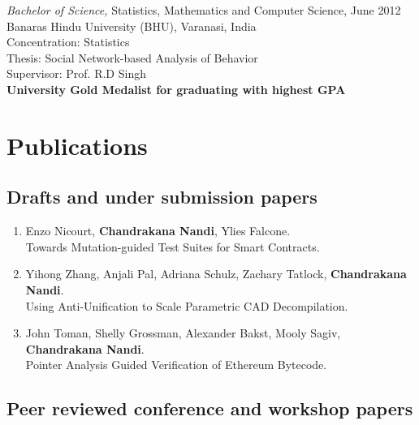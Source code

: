 \documentclass[margin, 10pt]{res} %
\begin{document}
\begin{resume}
{\sl Bachelor of Science,} Statistics, Mathematics and Computer Science, June 2012 \\
Banaras Hindu University (BHU), Varanasi, India \\
Concentration: Statistics \\
Thesis: Social Network-based Analysis of Behavior \\ Supervisor: Prof. R.D Singh\\
\textbf{University Gold Medalist for graduating with highest GPA}

\section{Publications}
\subsection{Drafts and under submission papers}
\begin{enumerate}
  \item Enzo Nicourt, \textbf{Chandrakana Nandi}, Ylies Falcone. \\
    Towards Mutation-guided Test Suites for Smart Contracts.

  \item Yihong Zhang, Anjali Pal, Adriana Schulz, Zachary Tatlock, \textbf{Chandrakana Nandi}. \\
    Using Anti-Unification to Scale Parametric CAD Decompilation.

  \item John Toman, Shelly Grossman, Alexander Bakst, Mooly Sagiv, \textbf{Chandrakana Nandi}. \\
    Pointer Analysis Guided Verification of Ethereum Bytecode.
\end{enumerate}

\subsection{Peer reviewed conference and workshop papers}
\begin{enumerate}


\end{enumerate}
\end{resume}
\end{document}
